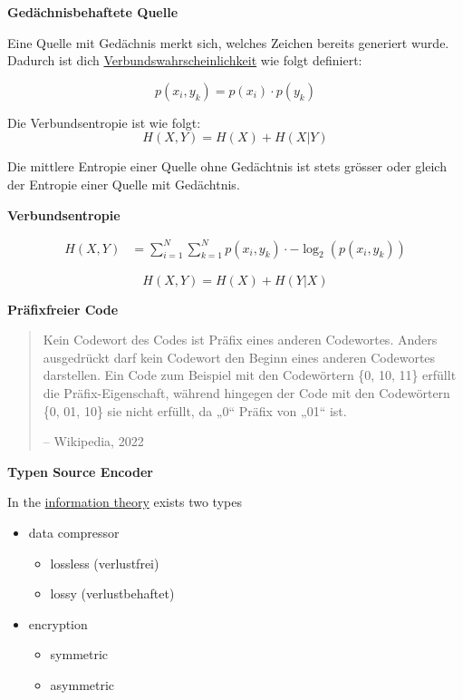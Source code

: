 \documentclass[11pt,twoside,twocolumn,landscape]{article}
\begin{document}
\textbf{Gedächnisbehaftete Quelle}

Eine Quelle mit Gedächnis merkt sich, welches Zeichen bereits generiert wurde.
Dadurch ist dich \href{../../../roam/20211002171445-verbundswahrscheinlichkeit.org}{Verbundswahrscheinlichkeit} wie folgt definiert:


\begin{equation}
p(x_i, y_k) = p(x_i) \cdot p(y_k)
\end{equation}

Die Verbundsentropie ist wie folgt:
\begin{equation}
H(X, Y) = H(X) + H(X|Y)
\end{equation}

Die mittlere Entropie einer Quelle ohne Gedächtnis ist stets grösser oder gleich der Entropie einer Quelle mit Gedächtnis.

\textbf{Verbundsentropie}

\begin{align}
H(X,Y) &= \sum_{i=1}^N \sum_{k=1}^N p(x_i, y_k) \cdot -\log_2(p(x_i,y_k))
\end{align}

\begin{equation}
H(X,Y) = H(X) + H(Y|X)
\end{equation}

\textbf{Präfixfreier Code}

\begin{quote}
Kein Codewort des Codes ist Präfix eines anderen Codewortes.
Anders ausgedrückt darf kein Codewort den Beginn eines anderen Codewortes darstellen.
Ein Code zum Beispiel mit den Codewörtern \{0, 10, 11\} erfüllt die Präfix-Eigenschaft, während hingegen der Code mit den Codewörtern \{0, 01, 10\} sie nicht erfüllt, da „0“ Präfix von „01“ ist.

-- Wikipedia, 2022
\end{quote}


\textbf{Typen Source Encoder}

In the \href{../../../roam/20211001174201-information_theory.org}{information theory} exists two types
\begin{itemize}
\item data compressor
\begin{itemize}
\item lossless (verlustfrei)
\item lossy (verlustbehaftet)
\end{itemize}
\item encryption
\begin{itemize}
\item symmetric
\item asymmetric
\end{itemize}
\end{itemize}
\end{document}
